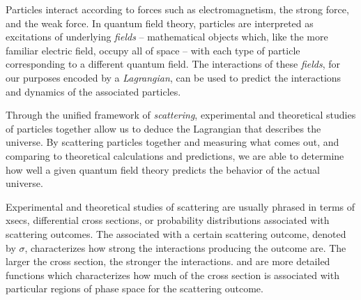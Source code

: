 

Particles interact according to forces such as electromagnetism, the strong force, and the weak force.
%
In quantum field theory, particles are interpreted as excitations of underlying \textit{fields} -- mathematical objects which, like the more familiar electric field, occupy all of space -- with each type of particle corresponding to a different quantum field.
%
The interactions of these \textit{fields}, for our purposes encoded by a \textit{Lagrangian}, can be used to predict the interactions and dynamics of the associated particles.

Through the unified framework of \textit{scattering}, experimental and theoretical studies of particles together allow us to deduce the Lagrangian that describes the universe.
%
By scattering particles together and measuring what comes out, and comparing to theoretical calculations and predictions, we are able to determine how well a given quantum field theory predicts the behavior of the actual universe.

Experimental and theoretical studies of scattering are usually phrased in terms of \glspl{xsec}, differential cross sections, or probability distributions associated with scattering outcomes.
%
The  associated with a certain scattering outcome, denoted by \(\sigma\), characterizes how strong the interactions producing the outcome are.
%
The larger the cross section, the stronger the interactions.
%
 and  are more detailed functions which characterizes how much of the cross section is associated with particular regions of phase space for the scattering outcome.


